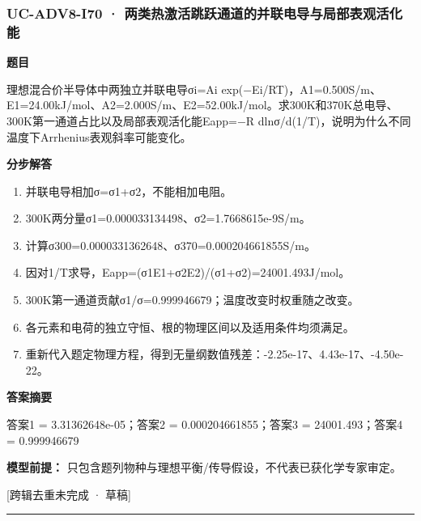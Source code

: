 \documentclass[UTF8,11pt,a4paper]{ctexart}
\begin{document}
\subsubsection*{UC-ADV8-I70 · 两类热激活跳跃通道的并联电导与局部表观活化能}
\noindent\textbf{题目}\par
理想混合价半导体中两独立并联电导σi=Ai exp(−Ei/RT)，A1=0.500S/m、E1=24.00kJ/mol、A2=2.000S/m、E2=52.00kJ/mol。求300K和370K总电导、300K第一通道占比以及局部表观活化能Eapp=−R dlnσ/d(1/T)，说明为什么不同温度下Arrhenius表观斜率可能变化。\par
\medskip\noindent\textbf{分步解答}
\begin{enumerate}
\item 并联电导相加σ=σ1+σ2，不能相加电阻。
\item 300K两分量σ1=0.000033134498、σ2=1.7668615e-9S/m。
\item 计算σ300=0.0000331362648、σ370=0.000204661855S/m。
\item 因对1/T求导，Eapp=(σ1E1+σ2E2)/(σ1+σ2)=24001.493J/mol。
\item 300K第一通道贡献σ1/σ=0.999946679；温度改变时权重随之改变。
\item 各元素和电荷的独立守恒、根的物理区间以及适用条件均须满足。
\item 重新代入题定物理方程，得到无量纲数值残差：-2.25e-17、4.43e-17、-4.50e-22。
\end{enumerate}
\noindent\textbf{答案摘要}\par
答案1 = 3.31362648e-05；答案2 = 0.000204661855；答案3 = 24001.493；答案4 = 0.999946679\par
\noindent\textbf{模型前提：}
只包含题列物种与理想平衡/传导假设，不代表已获化学专家审定。\par
\noindent\textcolor{red!65!black}{[跨辑去重未完成 · 草稿]} \par
\medskip\hrule\medskip
{}
\end{document}
